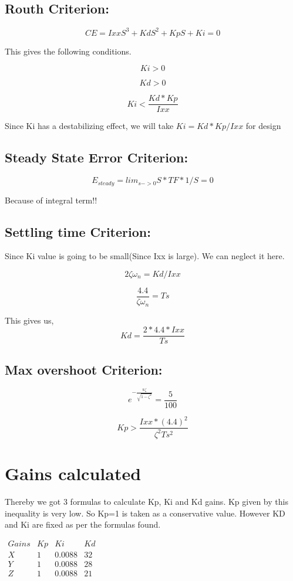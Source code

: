\documentclass[10pt,a4paper]{report}
\begin{document}
\subsection{Routh Criterion:}

\[
CE=IxxS^{3}+KdS^{2}+KpS+Ki=0
\]

This gives the following conditions.

\[
Ki>0
\]

\[
Kd>0
\]

\[
Ki<\frac{Kd*Kp}{Ixx}
\]

Since Ki has a destabilizing effect, we will take $Ki=Kd*Kp/Ixx$
for design

\subsection{Steady State Error Criterion:}

\[
E_{steady}=lim_{s->0}S*TF*1/S=0
\]

Because of integral term!!

\subsection{Settling time Criterion:}

Since Ki value is going to be small(Since Ixx is large). We can neglect
it here.

\[
2\zeta\omega_{n}=Kd/Ixx
\]

\[
\frac{4.4}{\zeta\omega_{n}}=Ts
\]

This gives us,\textbf{
	\[
	Kd=\frac{2*4.4*Ixx}{Ts}
	\]
}

\subsection{Max overshoot Criterion:}


\[
e^{-\frac{\pi\zeta}{\sqrt{1-\zeta^{2}}}}=\frac{5}{100}
\]

\[
Kp>\frac{Ixx*(4.4)^{2}}{\zeta^{2}Ts^{2}}
\]
\section{Gains calculated}
Thereby we got 3 formulas to calculate Kp, Ki and Kd gains. Kp given
by this inequality is very low. So Kp=1 is taken as a conservative
value. However KD and Ki are fixed as per the formulas found.
\begin{center}
	$\begin{array}{cccc}
	Gains & Kp & Ki & Kd\\
	X & 1 & 0.0088 & 32\\
	Y & 1 & 0.0088 & 28\\
	Z & 1 & 0.0088 & 21
	\end{array}$
	\par\end{center}
\end{document}
